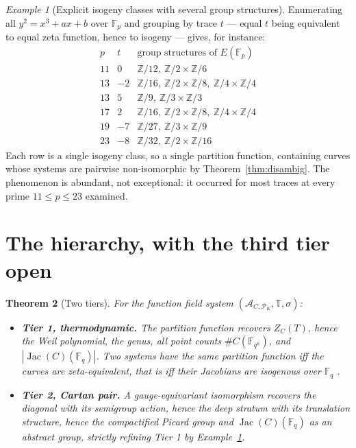 \documentclass[11pt]{amsart}
\numberwithin{equation}{section}
\newtheorem{theorem}{Theorem}[section]
\theoremstyle{definition}
\theoremstyle{remark}
\newtheorem{example}[theorem]{Example}
\newcommand{\Z}{\mathbb{Z}}
\newcommand{\F}{\mathbb{F}}
\newcommand{\T}{\mathbb{T}}
\newcommand{\cA}{\mathcal{A}}
\newcommand{\cP}{\mathcal{P}}
\newcommand{\Jac}{\operatorname{Jac}}
\begin{document}
\begin{example}[Explicit isogeny classes with several group structures]\label{ex:explicit}
Enumerating all $y^2=x^3+ax+b$ over $\F_p$ and grouping by trace $t$ --- equal $t$ being
equivalent to equal zeta function, hence to isogeny \cite{Tate} --- gives, for instance:
\[
\begin{array}{lll}
p & t & \text{group structures of }E(\F_p)\\\hline
11 & 0 & \Z/12,\ \Z/2\times\Z/6\\
13 & -2 & \Z/16,\ \Z/2\times\Z/8,\ \Z/4\times\Z/4\\
13 & 5 & \Z/9,\ \Z/3\times\Z/3\\
17 & 2 & \Z/16,\ \Z/2\times\Z/8,\ \Z/4\times\Z/4\\
19 & -7 & \Z/27,\ \Z/3\times\Z/9\\
23 & -8 & \Z/32,\ \Z/2\times\Z/16
\end{array}
\]
Each row is a single isogeny class, so a single partition function, containing curves whose
systems are pairwise non-isomorphic by Theorem~\ref{thm:disambig}. The phenomenon is
abundant, not exceptional: it occurred for most traces at every prime $11\le p\le23$ examined.
\end{example}

\section{The hierarchy, with the third tier open}

\begin{theorem}[Two tiers]\label{thm:tiers}
For the function field system $(\cA_{C,\cP_K},\T,\sigma)$:
\begin{itemize}
\item \textbf{Tier 1, thermodynamic.} The partition function recovers $Z_C(T)$, hence the
Weil polynomial, the genus, all point counts $\#C(\F_{q^n})$, and $|\Jac(C)(\F_q)|$. Two
systems have the same partition function iff the curves are zeta-equivalent, that is iff
their Jacobians are isogenous over $\F_q$ \cite{Tate}.
\item \textbf{Tier 2, Cartan pair.} A gauge-equivariant isomorphism recovers the diagonal
with its semigroup action, hence the deep stratum with its translation structure, hence the
compactified Picard group and $\Jac(C)(\F_q)$ as an abstract group, strictly refining Tier 1
by Example~\ref{ex:explicit}.
\end{itemize}
\end{theorem}
\end{document}
